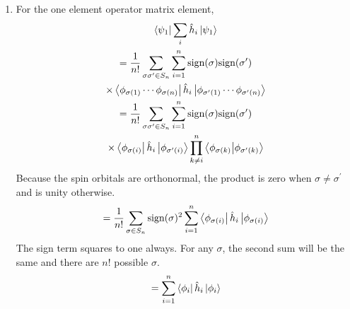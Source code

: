 \documentclass[final,3p,times,twocolumn]{elsarticle}
\begin{document}
\begin{enumerate}
	\item For the one element operator matrix element, 
	\begin{gather}
	\bra{\psi_1}\sum_i\hat h_i\ket{\psi_1}\\ 
	\begin{gathered}
	= \frac{1}{n!}\sum_{\sigma\sigma^\prime \in S_n} \sum_{i=1}^n \text{sign}(\sigma)\text{sign}(\sigma^\prime)
	 \\ \times \bra{\phi_{\sigma(1)} \cdots \phi_{\sigma(n)}}\hat h_i \ket{\phi_{\sigma^\prime(1)} \cdots \phi_{\sigma^\prime(n)}} 
	\end{gathered} \\
	 \begin{gathered} = \frac{1}{n!}\sum_{\sigma\sigma^\prime \in S_n} \sum_{i=1}^n \text{sign}(\sigma)\text{sign}(\sigma^\prime) \\
	 \times \bra{\phi_{\sigma(i)}} \hat h_i \ket{\phi_{\sigma^\prime(i)}} \prod_{k\neq i}^n \bra{\phi_{\sigma(k)}}\ket{\phi_{\sigma^\prime(k)}}
	 \end{gathered}
	\end{gather}
	Because the spin orbitals are orthonormal, the product is zero when $\sigma \neq \sigma^\prime$ and is unity otherwise.
	\begin{gather}
	= \frac{1}{n!} \sum_{\sigma \in S_n} \text{sign}(\sigma)^2\sum_{i=1}^n \bra{\phi_{\sigma(i)}} \hat h_i \ket{\phi_{\sigma(i)}}
	\end{gather}
	The sign term squares to one always. For any $\sigma$, the second sum will be the same and there are $n!$ possible $\sigma$.
	\begin{gather}
	= \sum_{i=1}^n \bra{\phi_i}\hat h_i \ket{\phi_i}
	\end{gather}
	

\end{enumerate}
\end{document}
